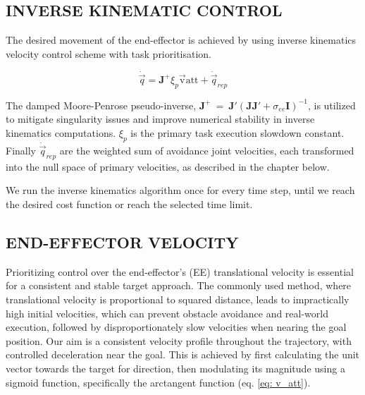 \documentclass[letterpaper, 10 pt, conference]{ieeeconf}  %
\begin{document}
\subsection{INVERSE KINEMATIC CONTROL}

The desired movement of the end-effector is achieved by using inverse kinematics velocity control scheme with task prioritisation. 


\begin{equation}
	\dot{\vec{q}} = \mathbf{J}^+ \xi_{p} \mathrm{\vec{v}{att}} + \dot{\vec{q}}_{rep}
\end{equation}

The damped Moore-Penrose pseudo-inverse, \(\mathbf{J}^+~=~\mathbf{J}'(\mathbf{J}\mathbf{J}' + \sigma_{ee} \mathbf{I})^{-1}\), is utilized to mitigate singularity issues and improve numerical stability in inverse kinematics computations. $\xi_{p}$ is the primary task execution slowdown constant. Finally $\dot{\vec{q}}_{rep}$ are the weighted sum of avoidance joint velocities, each transformed into the null space of primary velocities, as described in the chapter below. 



We run the inverse kinematics algorithm once for every time step, until we reach the desired cost function or reach the selected time limit. 

\subsection{END-EFFECTOR VELOCITY}


Prioritizing control over the end-effector's (EE) translational velocity is essential for a consistent and stable target approach. The commonly used method, where translational velocity is proportional to squared distance, leads to impractically high initial velocities, which can prevent obstacle avoidance and real-world execution, followed by disproportionately slow velocities when nearing the goal position. Our aim is a consistent velocity profile throughout the trajectory, with controlled deceleration near the goal. This is achieved by first calculating the unit vector towards the target for direction, then modulating its magnitude using a sigmoid function, specifically the arctangent function (eq. \ref{eq: v_att}).
\end{document}
